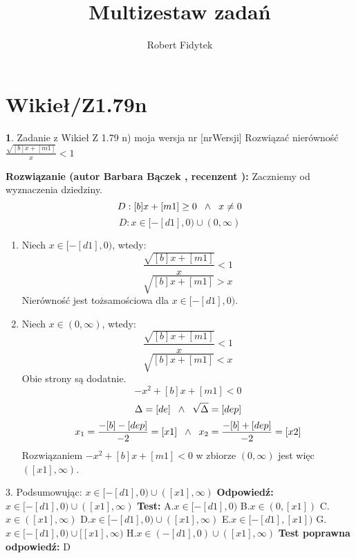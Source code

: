 \documentclass[12pt, a4paper]{article}
\title{Multizestaw zadań}
\author{Robert Fidytek}
\date{}
\theoremstyle{definition} %
\newtheorem{zad}{}
\newcommand{\kategoria}[1]{\section{#1}} %
\newcommand{\zadStart}[1]{\begin{zad}#1\newline} %
\newcommand{\zadStop}{\end{zad}}   %
\newcommand{\rozwStart}[2]{\noindent \textbf{Rozwiązanie (autor #1 , recenzent #2): }\newline} %
\newcommand{\rozwStop}{\newline}                                            %
\newcommand{\odpStart}{\noindent \textbf{Odpowiedź:}\newline}    %
\newcommand{\odpStop}{\newline}                                             %
\newcommand{\testStart}{\noindent \textbf{Test:}\newline} %
\newcommand{\testStop}{\newline} %
\newcommand{\kluczStart}{\noindent \textbf{Test poprawna odpowiedź:}\newline} %
\newcommand{\kluczStop}{\newline} %
\begin{document}
\maketitle


\kategoria{Wikieł/Z1.79n}
\zadStart{Zadanie z Wikieł Z 1.79 n) moja wersja nr [nrWersji]}
Rozwiązać nierówność $\frac{\sqrt{[b]x+[m1]}}{x}<1$
\zadStop
\rozwStart{Barbara Bączek}{}
Zaczniemy od wyznaczenia dziedziny.
$$D:[b]x+[m1] \geq 0 \hspace{0.2 cm} \wedge \hspace{0.2 cm} x \ne 0$$
$$D: x \in [ -[d1], 0) \cup (0, \infty)$$
\begin{enumerate}
\item Niech $x \in [-[d1], 0)$, wtedy:
$$\frac{\sqrt{[b]x+[m1]}}{x}<1$$
$$\sqrt{[b]x+[m1]}>x$$
Nierówność jest tożsamościowa dla $x \in [-[d1], 0)$.
\item  Niech $x \in (0, \infty)$, wtedy:
$$\frac{\sqrt{[b]x+[m1]}}{x}<1$$
$$\sqrt{[b]x+[m1]}<x$$
Obie strony są dodatnie.
$$-x^2 + [b]x+ [m1]<0$$
$$\Delta = [de] \hspace{0.2 cm} \wedge \hspace{0.2 cm} \sqrt{\Delta}= [dep]$$
$$x_1 = \frac{-[b]-[dep]}{-2}=[x1]  \hspace{0.2 cm} \wedge \hspace{0.2 cm} x_2 = \frac{-[b]+[dep]}{-2}=[x2]$$
Rozwiązaniem $-x^2+[b]x+[m1]<0$ w zbiorze $(0, \infty)$ jest więc $([x1], \infty)$.
\end{enumerate}
3. Podsumowując: $x \in [-[d1],0) \cup ([x1], \infty)$
\rozwStop
\odpStart
$x \in [-[d1],0) \cup ([x1], \infty)$
\odpStop
\testStart
A.$x \in [-[d1],0)$
B.$x \in (0,[x1])$
C.$x \in ([x1], \infty)$
D.$x \in [-[d1],0) \cup ([x1], \infty)$
E.$x \in [-[d1],[x1])$
G.$x \in [-[d1],0) \cup [[x1], \infty)$
H.$x \in (-[d1],0) \cup ([x1], \infty)$
\testStop
\kluczStart
D
\kluczStop
\end{document}

